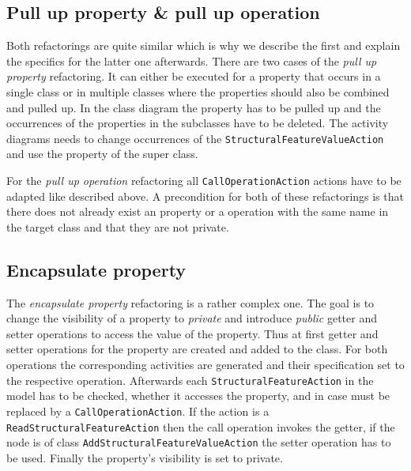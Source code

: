 \documentclass{llncs}
\begin{document}

\subsection{Pull up property \& pull up operation}
\label{sec:pullup}
Both refactorings are quite similar which is why we describe the first and explain the specifics for the latter one afterwards. 
There are two cases of the \textit{pull up property} refactoring. It can either be executed for a property that occurs in 
a single class or in multiple classes where the properties should also be combined and pulled up. In the class diagram 
the property has to be pulled up and the occurrences of the properties in the subclasses have to be deleted. The 
activity diagrams needs to change occurrences of the \texttt{StructuralFeatureValueAction} and use the property of 
the super class.

For the \textit{pull up operation} refactoring all \texttt{Call\-Operation\-Action} actions have to be adapted like described 
above. A precondition for both of these refactorings is that there does not already exist an property or a operation with the same name 
in the target class and that they are not private.

\subsection{Encapsulate property}
\label{sec:encapsulate}
The \textit{encapsulate property} refactoring is a rather complex one. The goal is to change the visibility of a property to 
\textit{private} and introduce \textit{public} getter and setter operations to access the value of the property. Thus at first 
getter and setter operations for the property are created and
added to the class. For both operations the corresponding activities are generated and their specification set to the 
respective operation. Afterwards each \texttt{Structural\-Feature\-Action} in the model has to be checked, whether it accesses 
the property, and in case must be replaced by a \texttt{Call\-Operation\-Action}. If the action is a 
\texttt{Read\-Structural\-Feature\-Action} then the call operation invokes the getter, if the node is of class 
\texttt{Add\-Structural\-Feature\-Value\-Action} the setter operation has to be used. Finally the property's 
visibility is set to private.
\end{document}
